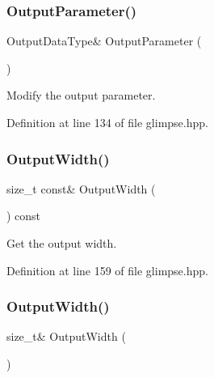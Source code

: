 \subsubsection{Output\+Parameter()\hspace{0.1cm}{\footnotesize\ttfamily [2/2]}}
{\footnotesize\ttfamily Output\+Data\+Type\& Output\+Parameter (\begin{DoxyParamCaption}{ }\end{DoxyParamCaption})\hspace{0.3cm}{\ttfamily [inline]}}



Modify the output parameter. 



Definition at line 134 of file glimpse.\+hpp.

\mbox{\label{classmlpack_1_1ann_1_1Glimpse_a32b3e3fe787456847fc3b2c39586ecb1}} 
\subsubsection{Output\+Width()\hspace{0.1cm}{\footnotesize\ttfamily [1/2]}}
{\footnotesize\ttfamily size\+\_\+t const\& Output\+Width (\begin{DoxyParamCaption}{ }\end{DoxyParamCaption}) const\hspace{0.3cm}{\ttfamily [inline]}}



Get the output width. 



Definition at line 159 of file glimpse.\+hpp.

\mbox{\label{classmlpack_1_1ann_1_1Glimpse_a54579ec9924e2a4a5bc0a4fb822ce80c}} 
\subsubsection{Output\+Width()\hspace{0.1cm}{\footnotesize\ttfamily [2/2]}}
{\footnotesize\ttfamily size\+\_\+t\& Output\+Width (\begin{DoxyParamCaption}{ }\end{DoxyParamCaption})\hspace{0.3cm}{\ttfamily [inline]}}




